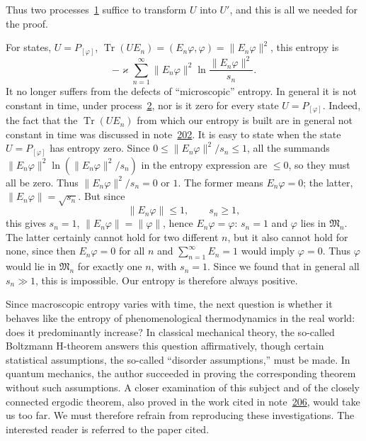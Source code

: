 \documentclass[fontsize=13pt,twoside,openany,headings=normal,parskip=false,bookmarkpackage=false,DIV=calc]{scrbook}
\begin{document}
 Thus two processes~\hyperref[eq:V.1.1]{1} suffice to transform $U$ into $U'$, and this is all we needed for the proof.

For states, $U=P_{[\varphi]}$, $\operatorname{Tr}(UE_n)=(E_n\varphi,\varphi)=\|E_n\varphi\|^2$, this entropy is
\[
-\varkappa\sum_{n=1}^{\infty}\|E_n\varphi\|^2\ln\frac{\|E_n\varphi\|^2}{s_n}.
\]
It no longer suffers from the defects of ``microscopic'' entropy. In general it is not constant in time, under process~\hyperref[eq:V.1.2]{2}, nor is it zero for every state $U=P_{[\varphi]}$. Indeed, the fact that the $\operatorname{Tr}(UE_n)$ from which our entropy is built are in general not constant in time was discussed in note~\hyperlink{note-202}{202}. It is easy to state when the state $U=P_{[\varphi]}$ has entropy zero. Since $0\leq\|E_n\varphi\|^2/s_n\leq1$, all the summands $\|E_n\varphi\|^2\ln(\|E_n\varphi\|^2/s_n)$ in the entropy expression are $\leq0$, so they must all be zero. Thus $\|E_n\varphi\|^2/s_n=0$ or $1$. The former means $E_n\varphi=0$; the latter, $\|E_n\varphi\|=\sqrt{s_n}$. But since
\[
\|E_n\varphi\|\leq1,\qquad s_n\geq1,
\]
this gives $s_n=1$, $\|E_n\varphi\|=\|\varphi\|$, hence $E_n\varphi=\varphi$: $s_n=1$ and $\varphi$ lies in $\mathfrak M_n$. The latter certainly cannot hold for two different $n$, but it also cannot hold for none, since then $E_n\varphi=0$ for all $n$ and $\sum_{n=1}^{\infty}E_n=1$ would imply $\varphi=0$. Thus $\varphi$ would lie in $\mathfrak M_n$ for exactly one $n$, with $s_n=1$. Since we found that in general all $s_n\gg1$, this is impossible. Our entropy is therefore always positive.

Since macroscopic entropy varies with time, the next question is whether it behaves like the entropy of phenomenological thermodynamics in the real world: does it predominantly increase? In classical mechanical theory, the so-called Boltzmann H-theorem answers this question affirmatively,
\hypertarget{origpage-222}{}%
though certain statistical assumptions, the so-called ``disorder assumptions,'' must be made. In quantum mechanics, the author succeeded in proving the corresponding theorem without such assumptions. A closer examination of this subject and of the closely connected ergodic theorem, also proved in the work cited in note~\hyperlink{note-206}{206}, would take us too far. We must therefore refrain from reproducing these investigations. The interested reader is referred to the paper cited.
\end{document}
